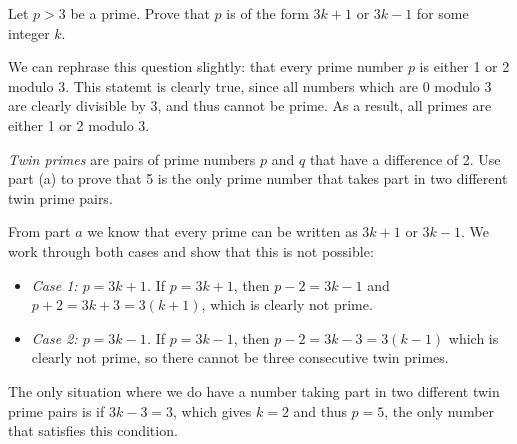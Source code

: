 \documentclass[11pt]{article}
\begin{document}

\begin{Parts}

\Part
Let $p > 3$ be a prime. Prove that $p$ is of the form $3k + 1$ or $3k-1$ for some integer $k$.

\begin{solution} 
    We can rephrase this question slightly: that every prime number $p$ is either 1 or 2 modulo 3. This statemt is clearly true, since all numbers which are $0$ modulo 3 are clearly divisible by 3, and thus cannot be prime. As a result, all primes are either 1 or 2 modulo 3. 
\end{solution} 

\Part
\textit{Twin primes} are pairs of prime numbers $p$ and $q$ that have a difference of 2. Use part (a) to prove that 5 is the only prime number that takes part in two different twin prime pairs.

\begin{solution}
   From part $a$ we know that every prime can be written as $3k + 1$ or $3k - 1$. We work through both cases and show that this is not possible:

   \begin{itemize}
        \item \textit{Case 1: $p = 3k + 1$.} If $p = 3k + 1$, then $p - 2 = 3k - 1$ and $p + 2 = 3k+3 = 3(k+1)$, which is clearly not prime.
        \item \textit{Case 2: $p = 3k-1$.} If $p = 3k-1$, then $p - 2 = 3k - 3 = 3(k-1)$ which is clearly not prime, so there cannot be three consecutive twin primes.
   \end{itemize}

   The only situation where we do have a number taking part in two different twin prime pairs is if $3k - 3 = 3$, which gives $k = 2$ and thus $p = 5$, the only number that satisfies this condition.
\end{solution}

\end{Parts}
\end{document}
